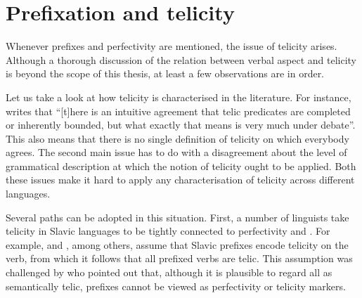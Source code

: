 \section{Prefixation and telicity}\label{section:new:telicity}
Whenever prefixes and perfectivity are mentioned, the issue of telicity arises. Although a thorough discussion of the relation between verbal aspect and telicity is beyond the scope of this thesis, at least a few observations are in order. %

Let us take a look at how telicity is characterised in the literature. For instance, \citet[3]{Rothstein:08a} writes that ``[t]here is an intuitive agreement that telic predicates are completed or inherently bounded, but what exactly that means is very much under debate''. This also means that there is no single definition of telicity on which everybody agrees. The second main issue has to do with a disagreement about the level of grammatical description at which the notion of telicity ought to be applied. Both these issues make it hard to apply any characterisation of telicity across different languages. 

Several paths can be adopted in this situation. First, a number of linguists take telicity in Slavic languages to be tightly connected to perfectivity and . For example, \citet{Borer:03} and \citet{vanHout:08}, among others, assume that Slavic prefixes encode telicity on the verb, from which it follows that all prefixed verbs are telic. This assumption was challenged by \citet{Filip:03} who pointed out that, although it is plausible to regard all  as semantically telic, prefixes cannot be viewed as perfectivity or telicity markers.  

